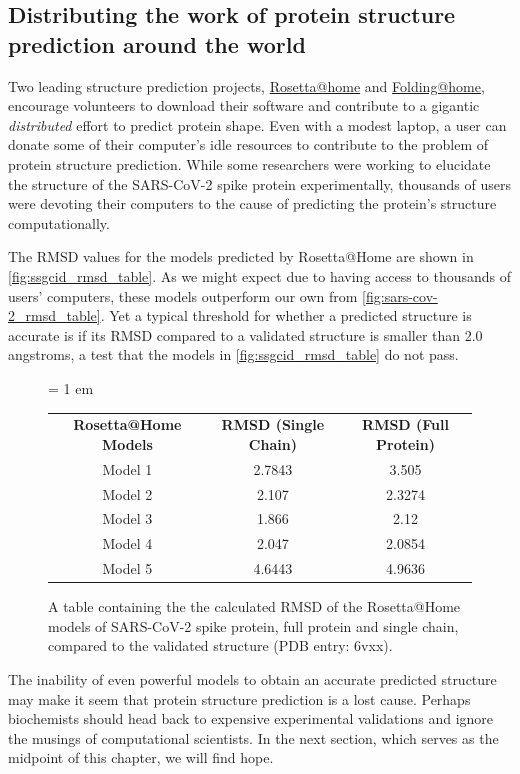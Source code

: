 \subsection{Distributing the work of protein structure prediction around the world}

Two leading structure prediction projects, \href{https://boinc.bakerlab.org}{Rosetta@home} and \href{https://foldingathome.org}{Folding@home}, encourage volunteers to download their software and contribute to a gigantic \textit{distributed} effort to predict protein shape. Even with a modest laptop, a user can donate some of their computer's idle resources to contribute to the problem of protein structure prediction. While some researchers were working to elucidate the structure of the SARS-CoV-2 spike protein experimentally, thousands of users were devoting their computers to the cause of predicting the protein's structure computationally.

The RMSD values for the models predicted by Rosetta@Home are shown in \autoref{fig:ssgcid_rmsd_table}. As we might expect due to having access to thousands of users' computers, these models outperform our own from \autoref{fig:sars-cov-2_rmsd_table}. Yet a typical threshold for whether a predicted structure is accurate is if its RMSD compared to a validated structure is smaller than 2.0 angstroms, a test that the models in \autoref{fig:ssgcid_rmsd_table} do not pass.

\begin{figure}[h]
	\centering
	\tabcolsep = 1 em
	\mySfFamily
	\begin{tabular}{c c c}
		\textbf{Rosetta@Home Models} & \textbf{RMSD (Single Chain)} & \textbf{RMSD (Full Protein)}\\
		Model 1  & 2.7843 & 3.505\phantom{x}  \\
		Model 2  & 2.107\phantom{x} & 2.3274 \\
		Model 3  & 1.866\phantom{x} & 2.12\phantom{xx} \\
		Model 4  & 2.047\phantom{x} & 2.0854 \\
		Model 5  & 4.6443 & 4.9636
	\end{tabular}
	\caption{A table containing the the calculated RMSD of the Rosetta@Home models of SARS-CoV-2 spike protein, full protein and single chain, compared to the validated structure (PDB entry: 6vxx).}
	\label{fig:ssgcid_rmsd_table}
\end{figure}

The inability of even powerful models to obtain an accurate predicted structure may make it seem that protein structure prediction is a lost cause. Perhaps biochemists should head back to expensive experimental validations and ignore the musings of computational scientists. In the next section, which serves as the midpoint of this chapter, we will find hope.\\

